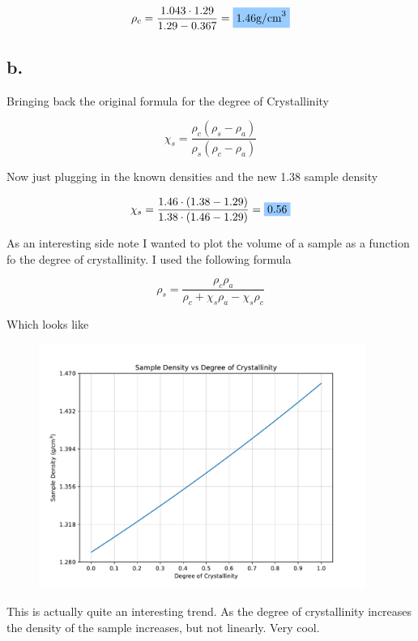 \documentclass{article}
\newcommand\answer[1]{\colorbox{CornflowerBlue}{$#1$}}
\begin{document}
\[ \rho_c = \frac{1.043 \cdot 1.29}{1.29 - 0.367} = \answer{1.46 \text{g/cm}^3} \]

\subsection*{b.}
\indent

Bringing back the original formula for the degree of Crystallinity

\[ \chi_s = \frac{\rho_c \left( \rho_s - \rho_a \right)}{\rho_s \left( \rho_c - \rho_a \right)} \]

Now just plugging in the known densities and the new 1.38 sample density

\[ \chi_s = \frac{1.46 \cdot \left( 1.38 - 1.29 \right)}{1.38 \cdot \left( 1.46 - 1.29 \right)} = \answer{0.56} \]

As an interesting side note I wanted to plot the volume of a sample as a function fo the degree of crystallinity. I used the following formula

\[ \rho_s = \frac{\rho_c \rho_a}{\rho_c + \chi_s \rho_a - \chi_s \rho_c} \]

Which looks like

\begin{figure}[H]
    \centering
    \includegraphics[width=0.95\textwidth]{density_vs_crystallinity.pdf}
\end{figure}

This is actually quite an interesting trend. As the degree of crystallinity increases the density of the sample increases, but not linearly. Very cool.
\end{document}
